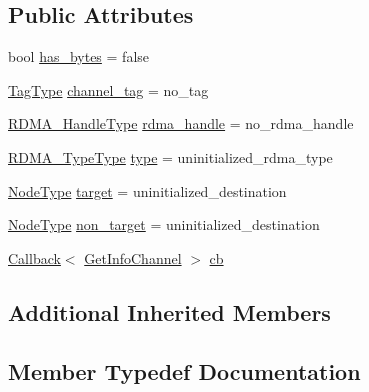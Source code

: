 \subsection*{Public Attributes}
\begin{DoxyCompactItemize}
\item 
bool \hyperlink{structvt_1_1rdma_1_1_create_channel_a614a55f5519b9367c6a2d70561552cc2}{has\+\_\+bytes} = false
\item 
\hyperlink{namespacevt_a84ab281dae04a52a4b243d6bf62d0e52}{Tag\+Type} \hyperlink{structvt_1_1rdma_1_1_create_channel_a8d17a858ee1c432e723237c359e695e4}{channel\+\_\+tag} = no\+\_\+tag
\item 
\hyperlink{namespacevt_a10442579ec4e7ebef223818e64bcf908}{R\+D\+M\+A\+\_\+\+Handle\+Type} \hyperlink{structvt_1_1rdma_1_1_create_channel_a27cb16b5aedbf0f2a905dc61fd89d783}{rdma\+\_\+handle} = no\+\_\+rdma\+\_\+handle
\item 
\hyperlink{namespacevt_1_1rdma_ac848e1d9da43db6294bd06f83e5d3946}{R\+D\+M\+A\+\_\+\+Type\+Type} \hyperlink{structvt_1_1rdma_1_1_create_channel_a69ed66b06ab210ac3db0c17e76d11c19}{type} = uninitialized\+\_\+rdma\+\_\+type
\item 
\hyperlink{namespacevt_a866da9d0efc19c0a1ce79e9e492f47e2}{Node\+Type} \hyperlink{structvt_1_1rdma_1_1_create_channel_ad562afaf95db8f77426f698b207de63f}{target} = uninitialized\+\_\+destination
\item 
\hyperlink{namespacevt_a866da9d0efc19c0a1ce79e9e492f47e2}{Node\+Type} \hyperlink{structvt_1_1rdma_1_1_create_channel_aca4aa45ce8f62e0f4ae02c0ea2c9428c}{non\+\_\+target} = uninitialized\+\_\+destination
\item 
\hyperlink{namespacevt_a36db99df4c973d48b1118a293fff533f}{Callback}$<$ \hyperlink{structvt_1_1rdma_1_1_get_info_channel}{Get\+Info\+Channel} $>$ \hyperlink{structvt_1_1rdma_1_1_create_channel_a0672669be0eb2cb8cf293e60a88af2ad}{cb}
\end{DoxyCompactItemize}
\subsection*{Additional Inherited Members}


\subsection{Member Typedef Documentation}
\mbox{\label{structvt_1_1rdma_1_1_create_channel_ae16004f4d4886e470c8e896fca551afd}} 
